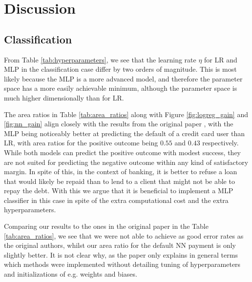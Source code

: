 \documentclass[a4paper, 11pt, twocolumn]{article}
\begin{document}
\section{Discussion}

\subsection{Classification}
From Table \ref{tab:hyperparameters}, we see that the learning rate $\eta$ for
LR and MLP in the classification case differ by two orders of magnitude. This is
most likely because the MLP is a more advanced model, and therefore the parameter
space has a more easily achievable minimum, although the parameter space is much
higher dimensionally than for LR.


The area ratios in Table \ref{tab:area_ratios} along with Figure
\ref{fig:logreg_gain} and \ref{fig:nn_gain} align closely
with the results from the original paper \cite{origarticle}, with the MLP being
noticeably better at predicting the default of a credit card user than LR, with
area ratios for the positive outcome being $0.55$ and $0.43$ respectively.
While both models can predict the positive outcome with modest success, they are
not suited for predicting the negative outcome within any kind of satisfactory
margin. In spite of this, in the context of banking, it is better to refuse a 
loan that would likely be repaid than to lend to a client that might not be able 
to repay the debt. With this we argue that it is beneficial to implement a MLP 
classifier in this case in spite of the extra computational cost and the extra 
hyperparameters.

Comparing our results to the ones in the original paper in the Table 
\ref{tab:area_ratios}, we see that we were not able to achieve as good error rates 
as the original authors, whilst our area ratio for the default NN payment is only 
slightly better. It is not clear why, as the paper only explains in general terms
which methods were implemented without detailing tuning of hyperparameters and 
initializations of e.g. weights and biases. 
\end{document}
